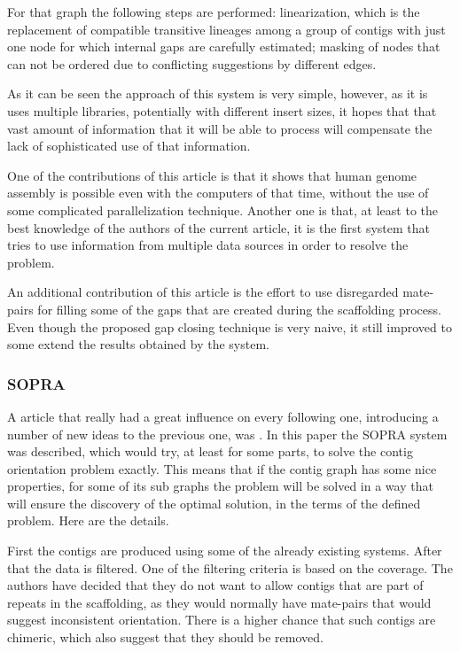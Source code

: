 \documentclass[11pt]{article}
\begin{document}
For that graph the following steps are performed: linearization, which is the
replacement of compatible transitive lineages among a group of contigs with just
one node for which internal gaps are carefully estimated; masking of nodes that
can not be ordered due to conflicting suggestions by different edges.

As it can be seen the approach of this system is very simple, however, as it is
uses multiple libraries, potentially with different insert sizes, it hopes that
that vast amount of information that it will be able to process will compensate
the lack of sophisticated use of that information. 

One of the contributions of this article is that it shows that human genome
assembly is possible even with the computers of that time, without the use of
some complicated parallelization technique. Another one is that, at least to the
best knowledge of the authors of the current article, it is the first system
that tries to use information from multiple data sources in order to resolve the
problem.

An additional contribution of this article is the effort to use disregarded
mate-pairs for filling some of the gaps that are created during the scaffolding
process. Even though the proposed gap closing technique is very naive, it still
improved to some extend the results obtained by the system.

\subsubsection{SOPRA} %
\label{ssub:SOPRA}
A article that really had a great influence on every following one, introducing
a number of new ideas to the previous one, was \cite{SOPRA}. In this paper the
SOPRA system was described, which would try, at least for some parts, to solve
the contig orientation problem exactly. This means that if the contig graph has
some nice properties, for some of its sub graphs the problem will be solved in a
way that will ensure the discovery of the optimal solution, in the terms of the
defined problem. Here are the details.

First the contigs are produced using some of the already existing systems. After
that the data is filtered. One of the filtering criteria is based on the
coverage. The authors have decided that they do not want to allow contigs that
are part of repeats in the scaffolding, as they would normally have mate-pairs
that would suggest inconsistent orientation. There is a higher chance that such
contigs are chimeric, which also suggest that they should be removed.
\end{document}
